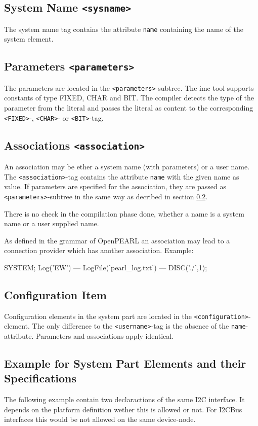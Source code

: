 \subsection{System Name \texttt{<sysname>}}
The system name tag contains the attribute \verb|name| containing the 
name of the system element.

\subsection{Parameters \texttt{<parameters>}}
\label{sec_parameters}
The parameters are located in the \verb|<parameters>|-subtree.
The imc tool supports constants of type FIXED, CHAR and BIT.
The compiler detects  the type of the parameter
from the literal and passes the literal as content to the corresponding
\verb|<FIXED>|-, \verb|<CHAR>|- or \verb|<BIT>|-tag.

\subsection{Associations \texttt{<association>}}
An association may be ether a system name (with parameters) or a user name.
The  \verb|<association>|-tag contains the attribute \verb|name| with the 
given name as value. If parameters are specified for the association,
they are passed as \verb|<parameters>|-subtree in the same way as decribed 
in section \ref{sec_parameters}.

There is no check in the compilation phase done,
whether a name is a system name
or a user supplied name.

As defined in the grammar of OpenPEARL an association may lead to a 
connection provider which has another association.
Example:
\begin{PEARLCode}
SYSTEM;
  Log('EW') --- LogFile('pearl_log.txt') --- DISC('./',1);
\end{PEARLCode}


\subsection{Configuration Item}
Configuration elements in the system part are located in the
\verb|<configuration>|-element. 
The only difference to the \verb|<username>|-tag is the absence of the 
\verb|name|-attribute. Parameters and associations apply identical.

\subsection{Example for System Part Elements and their Specifications}
The following example contain two declaractions of the same I2C interface.
It depends on the platform definition wether this is allowed or not. For I2CBus 
interfaces this would be not allowed on the same device-node.

